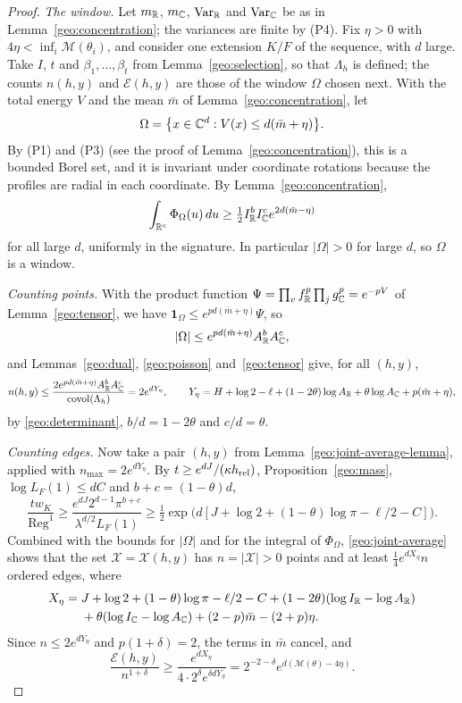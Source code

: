 \begin{proof}
\emph{The window.} Let $m_\mathbb R$, $m_\mathbb C$, $\mathrm{Var}_\mathbb R$ and
$\mathrm{Var}_\mathbb C$ be as in Lemma~\ref{geo:concentration}; the variances
are finite by (P4). Fix $\eta>0$ with
$4\eta<\inf_i\mathcal M(\theta_i)$, and consider one extension $K/F$ of
the sequence, with $d$ large. Take $I$, $t$ and
$\beta_1,\dots,\beta_t$ from Lemma~\ref{geo:selection}, so that
$\Lambda_h$ is defined; the counts $n(h,y)$ and $\mathcal E(h,y)$ are those
of the window $\Omega$ chosen next. With the total energy $V$ and the mean
$\bar m$ of Lemma~\ref{geo:concentration}, let
\[
 \Omega=\bigl\{x\in\mathbb C^d:V(x)\le d(\bar m+\eta)\bigr\}.
\]
By (P1) and (P3) (see the proof of Lemma~\ref{geo:concentration}), this
is a bounded Borel set, and it is invariant under
coordinate rotations because the profiles are radial in each
coordinate. By Lemma~\ref{geo:concentration},
\[
 \int_{\mathbb R^c}\Phi_\Omega(u)\,du\ge\tfrac12I_\mathbb R^bI_\mathbb C^ce^{2d(\bar m-\eta)}
\]
for all large $d$, uniformly in the signature. In particular
$|\Omega|>0$ for large $d$, so $\Omega$ is a window.

\emph{Counting points.} With the product function
$\Psi=\prod_vf_\mathbb R^p\prod_jg_\mathbb C^p=e^{-pV}$ of Lemma~\ref{geo:tensor}, we
have $\mathbf 1_\Omega\le e^{pd(\bar m+\eta)}\Psi$, so
\[
 |\Omega|\le e^{pd(\bar m+\eta)}A_\mathbb R^bA_\mathbb C^c,
\]
and Lemmas~\ref{geo:dual}, \ref{geo:poisson} and~\ref{geo:tensor} give,
for all $(h,y)$,
\[
 n(h,y)\le\frac{2e^{pd(\bar m+\eta)}A_\mathbb R^bA_\mathbb C^c}{\operatorname{covol}(\Lambda_h)}
 =2e^{dY_\eta},\qquad
 Y_\eta=H+\log2-\ell+(1-2\theta)\log A_\mathbb R+\theta\log A_\mathbb C
 +p(\bar m+\eta),
\]
by \eqref{geo:determinant}, $b/d=1-2\theta$ and $c/d=\theta$.

\emph{Counting edges.} Now take a pair $(h,y)$ from
Lemma~\ref{geo:joint-average-lemma}, applied with
$n_{\max}=2e^{dY_\eta}$. By $t\ge e^{dJ}/(\kappa h_{\rm rel})$,
Proposition~\ref{geo:mass}, $\log L_F(1)\le dC$ and $b+c=(1-\theta)d$,
\[
 \frac{tw_K}{\operatorname{Reg}^1}\ge
 \frac{e^{dJ}2^{d-1}\pi^{b+c}}{\lambda^{d/2}L_F(1)}
 \ge\tfrac12\exp\bigl(d[J+\log2+(1-\theta)\log\pi-\ell/2-C]\bigr).
\]
Combined with the bounds for $|\Omega|$ and for the integral of
$\Phi_\Omega$, \eqref{geo:joint-average} shows that the set
$\mathcal X=\mathcal X(h,y)$ has $n=|\mathcal X|>0$ points and at least
$\tfrac14e^{dX_\eta}n$ ordered edges, where
\[
 \begin{aligned}
 X_\eta={}&J+\log2+(1-\theta)\log\pi-\ell/2-C
 +(1-2\theta)(\log I_\mathbb R-\log A_\mathbb R)\\
 &+\theta(\log I_\mathbb C-\log A_\mathbb C)+(2-p)\bar m-(2+p)\eta.
 \end{aligned}
\]
Since $n\le2e^{dY_\eta}$ and $p(1+\delta)=2$, the terms in $\bar m$ cancel,
and
\[
 \frac{\mathcal E(h,y)}{n^{1+\delta}}
 \ge\frac{e^{dX_\eta}}{4\cdot2^\delta e^{\delta dY_\eta}}
 =2^{-2-\delta}e^{d(\mathcal M(\theta)-4\eta)}.
\]


\end{proof}
